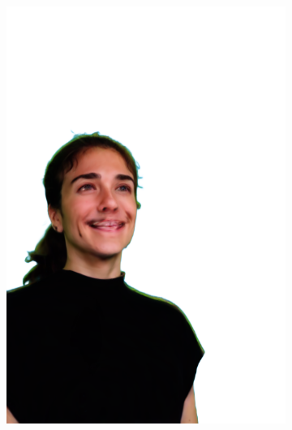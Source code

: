 \begin{figure}[ht]
\begin{subfigure}{0.08\linewidth}
        \includegraphics[width=\textwidth]{Figures/results/low/irene_smile/11_render.png}

\end{subfigure}
\end{figure}
